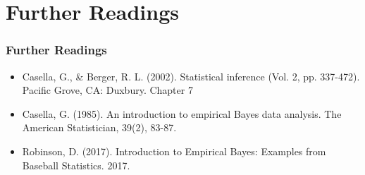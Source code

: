 \documentclass[
  shownotes,
  xcolor={svgnames},
  hyperref={colorlinks,citecolor=DarkBlue,linkcolor=DarkRed,urlcolor=DarkBlue}
  ]{beamer}
\begin{document}


\section{Further Readings}
\begin{frame}
\frametitle{Further Readings}
\footnotesize
\begin{itemize}
  \item Casella, G., \& Berger, R. L. (2002). Statistical inference (Vol. 2, pp. 337-472). Pacific Grove, CA: Duxbury. Chapter 7
  \medskip
  \item Casella, G. (1985). An introduction to empirical Bayes data analysis. The American Statistician, 39(2), 83-87.
  \medskip
  \item Robinson, D. (2017). Introduction to Empirical Bayes: Examples from Baseball Statistics. 2017.
  \end{itemize}

\end{frame}



\end{document}
